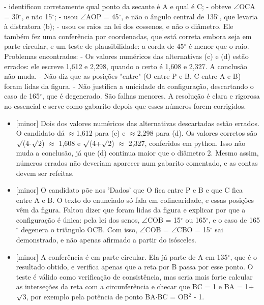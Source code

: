\documentclass{article}%
\begin{document}
{-} identificou corretamente qual ponto da secante é A e qual é C;\newline%
{-} obteve $\angle$OCA = 30$^\circ$, e não 15$^\circ$;\newline%
{-} usou $\angle$AOP = 45$^\circ$, e não o ângulo central de 135$^\circ$, que levaria à distratora (b);\newline%
{-} usou os raios na lei dos cossenos, e não o diâmetro.\newline%
\newline%
Ele também fez uma conferência por coordenadas, que está correta embora seja em parte circular, e um teste de plausibilidade: a corda de 45$^\circ$ é menor que o raio.\newline%
\newline%
Problemas encontrados:\newline%
{-} Os valores numéricos das alternativas (c) e (d) estão errados: ele escreve 1,612 e 2,298, quando o certo é 1,608 e 2,327. A conclusão não muda.\newline%
{-} Não diz que as posições "entre" (O entre P e B, C entre A e B) foram lidas da figura.\newline%
{-} Não justifica a unicidade da configuração, descartando o caso de 165$^\circ$, que é degenerado.\newline%
\newline%
São falhas menores. A resolução é clara e rigorosa no essencial e serve como gabarito depois que esses números forem corrigidos.%
\begin{itemize}%
\item%
{[}minor{]} Dois dos valores numéricos das alternativas descartadas estão errados. O candidato dá $\approx$1,612 para (c) e $\approx$2,298 para (d). Os valores corretos são $\surd$(4-$\surd$2) $\approx$ 1,608 e $\surd$(4+$\surd$2) $\approx$ 2,327, conferidos em python. Isso não muda a conclusão, já que (d) continua maior que o diâmetro 2. Mesmo assim, números errados não deveriam aparecer num gabarito comentado, e as contas devem ser refeitas.%
\item%
{[}minor{]} O candidato põe nos 'Dados' que O fica entre P e B e que C fica entre A e B. O texto do enunciado só fala em colinearidade, e essas posições vêm da figura. Faltou dizer que foram lidas da figura e explicar por que a configuração é única: pela lei dos senos, $\angle$COB = 15$^\circ$ ou 165$^\circ$, e o caso de 165$^\circ$ degenera o triângulo OCB. Com isso, $\angle$COB = $\angle$CBO = 15$^\circ$ sai demonstrado, e não apenas afirmado a partir do isósceles.%
\item%
{[}minor{]} A conferência é em parte circular. Ela já parte de A em 135$^\circ$, que é o resultado obtido, e verifica apenas que a reta por B passa por esse ponto. O teste é válido como verificação de consistência, mas seria mais forte calcular as interseções da reta com a circunferência e checar que BC = 1 e BA = 1+$\surd$3, por exemplo pela potência de ponto BA$\cdot$BC = OB$^2$ - 1.%
\end{itemize}%
\end{document}
